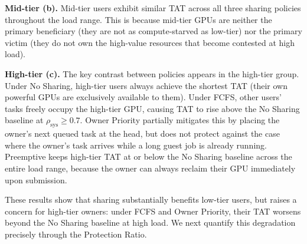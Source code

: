 
\textbf{Mid-tier (b).}
Mid-tier users exhibit similar TAT across all three sharing policies
throughout the load range.
This is because mid-tier GPUs are neither the primary beneficiary
(they are not as compute-starved as low-tier) nor the primary victim
(they do not own the high-value resources that become contested at high load).


\textbf{High-tier (c).}
The key contrast between policies appears in the high-tier group.
Under No Sharing, high-tier users always achieve the shortest TAT
(their own powerful GPUs are exclusively available to them).
Under FCFS, other users' tasks freely occupy the high-tier GPU,
causing TAT to rise above the No Sharing baseline at $\rho_\mathrm{sys} \geq 0.7$.
Owner Priority partially mitigates this by placing the owner's next queued task
at the head, but does not protect against the case where the owner's task arrives
while a long guest job is already running.
Preemptive keeps high-tier TAT at or below the No Sharing baseline across
the entire load range, because the owner can always reclaim their GPU
immediately upon submission.


These results show that sharing substantially benefits low-tier users,
but raises a concern for high-tier owners: under FCFS and Owner Priority,
their TAT worsens beyond the No Sharing baseline at high load.
We next quantify this degradation precisely through the Protection Ratio.

